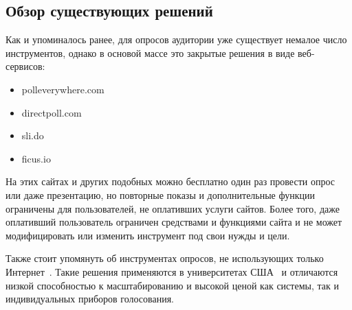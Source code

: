 \subsection{Обзор существующих решений}
Как и упоминалось ранее, для опросов аудитории уже существует немалое число инструментов, однако в основой массе это закрытые решения в виде веб-сервисов:
\begin{itemize}
	\item polleverywhere.com
	\item directpoll.com
	\item sli.do
	\item ficus.io
\end{itemize}
На этих сайтах и других подобных можно бесплатно один раз провести опрос или даже презентацию, но повторные показы и дополнительные функции ограничены для пользователей, не оплативших услуги сайтов. Более того, даже оплативший пользователь ограничен средствами и функциями сайта и не может модифицировать или изменить инструмент под свои нужды и цели.

Также стоит упомянуть об инструментах опросов, не использующих только Интернет~\autocite{ombea}. Такие решения применяются в университетах США~\autocite{nea} и отличаются низкой способностью к масштабированию и высокой ценой как системы, так и индивидуальных приборов голосования.

